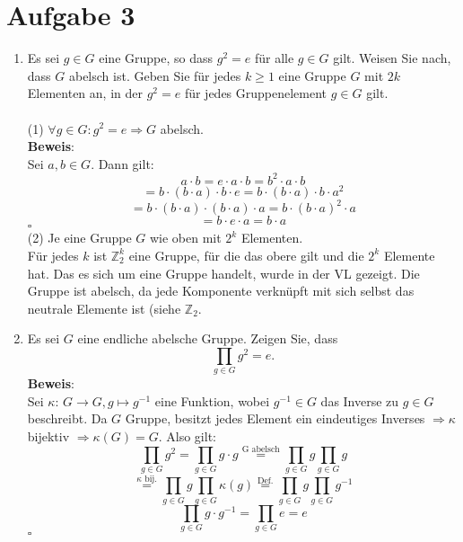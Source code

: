 \documentclass[11pt,a4paper,ngerman]{article}
\begin{document}
\section*{Aufgabe 3}
\begin{enumerate}[\bfseries a)]
\item Es sei $g \in G$ eine Gruppe, so dass $g^2 = e$ für alle $g \in G$ gilt. Weisen Sie nach, dass $G$ abelsch ist. Geben Sie für jedes $k \geq 1$ eine Gruppe $G$ mit $2k$ Elementen an, in der $g^2 = e$ für jedes Gruppenelement $g \in G$ gilt.
\\ \\
(1) $\forall g \in G: g^2 = e \Rightarrow G$ abelsch. \\


\textbf{Beweis}: \\
Sei $a,b \in G$. Dann gilt:
$$ a \cdot b = e \cdot a \cdot b = b^2 \cdot a \cdot b $$
$$ = b \cdot (b \cdot a) \cdot b \cdot e = b \cdot (b \cdot a) \cdot b \cdot a^2 $$
$$ = b \cdot (b \cdot a) \cdot  (b \cdot a) \cdot a = b \cdot (b \cdot a)^2 \cdot a $$
$$ = b \cdot e \cdot a = b \cdot a$$
\mbox{} \hfill $\square$
\\
(2) Je eine Gruppe $G$ wie oben mit $2^k$ Elementen. \\

Für jedes $k$ ist $\mathbb{Z}_2^k$ eine Gruppe, für die das obere gilt und die $2^k$ Elemente hat. Das es sich um eine Gruppe handelt, wurde in der VL gezeigt. Die Gruppe ist abelsch, da jede Komponente verknüpft mit sich selbst das neutrale Elemente ist (siehe $\mathbb{Z}_2$.
\item Es sei $G$ eine endliche abelsche Gruppe. Zeigen Sie, dass 
$$ \prod_{g\in G}g^2 = e.$$
\textbf{Beweis}: \\
Sei $\kappa:\,G \to G, g \mapsto g^{-1}$ eine Funktion, wobei $g^{-1} \in G$ das Inverse zu $g \in G$ beschreibt. Da $G$ Gruppe, besitzt jedes Element ein eindeutiges Inverses $\Rightarrow \kappa$ bijektiv $\Rightarrow \kappa(G) = G$.
Also gilt: \\
$$ \prod_{g\in G}g^2 = \prod_{g\in G}g \cdot g \stackrel{\text{G abelsch}}{=} \prod_{g\in G}g \prod_{g\in G}g  $$
$$ \stackrel{\kappa \text{ bij.}}{=} \prod_{g\in G}g \prod_{g\in G}\kappa(g)
 \stackrel{\text{Def.}}{=} \prod_{g\in G}g \prod_{g\in G} g^{-1} $$
$$ \prod_{g\in G}g \cdot g^{-1} =  \prod_{g\in G}e = e $$
\mbox{} \hfill $\square$
\end{enumerate}
\end{document}
